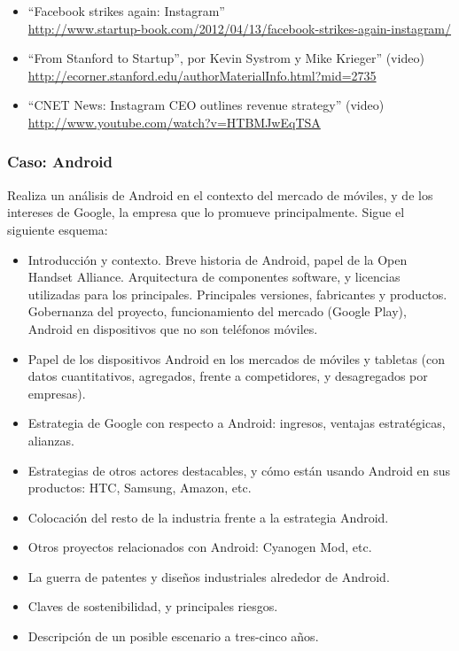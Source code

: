 \documentclass[a4paper,12pt]{article}
\begin{document}
\begin{itemize}
\item ``Facebook strikes again: Instagram'' \\
  \url{http://www.startup-book.com/2012/04/13/facebook-strikes-again-instagram/}

\item ``From Stanford to Startup'', por Kevin Systrom y Mike Krieger'' (video) \\
  \url{http://ecorner.stanford.edu/authorMaterialInfo.html?mid=2735}

\item ``CNET News: Instagram CEO outlines revenue strategy'' (video) \\
  \url{http://www.youtube.com/watch?v=HTBMJwEqTSA}

\end{itemize}

\subsubsection{Caso: Android}
\label{sub:case-android}

Realiza un análisis de Android en el contexto del mercado de móviles, y de los intereses de Google, la empresa que lo promueve principalmente. Sigue el siguiente esquema:

\begin{itemize}
\item Introducción y contexto. Breve historia de Android, papel de la Open Handset Alliance. Arquitectura de componentes software, y licencias utilizadas para los principales. Principales versiones, fabricantes y productos. Gobernanza del proyecto, funcionamiento del mercado (Google Play), Android en dispositivos que no son teléfonos móviles.
\item Papel de los dispositivos Android en los mercados de móviles y tabletas (con datos cuantitativos, agregados, frente a competidores, y desagregados por empresas).
\item Estrategia de Google con respecto a Android: ingresos, ventajas estratégicas, alianzas.
\item Estrategias de otros actores destacables, y cómo están usando Android en sus productos: HTC, Samsung, Amazon, etc.
\item Colocación del resto de la industria frente a la estrategia Android.
\item Otros proyectos relacionados con Android: Cyanogen Mod, etc.
\item La guerra de patentes y diseños industriales alrededor de Android.
\item Claves de sostenibilidad, y principales riesgos.
\item Descripción de un posible escenario a tres-cinco años.
\end{itemize}
\end{document}
